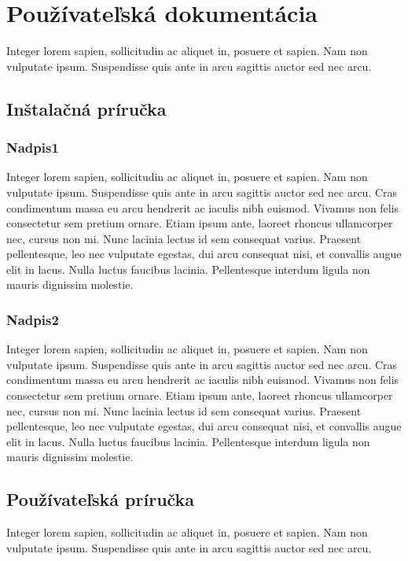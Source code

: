 \newpage
\section{Používateľská dokumentácia}
Integer lorem sapien, sollicitudin ac aliquet in, posuere et sapien. Nam non vulputate ipsum. Suspendisse quis ante in arcu sagittis auctor sed nec arcu.

\subsection{Inštalačná príručka}\label{install_guide}

\subsubsection{Nadpis1}
Integer lorem sapien, sollicitudin ac aliquet in, posuere et sapien. Nam non vulputate ipsum. Suspendisse quis ante in arcu sagittis auctor sed nec arcu. Cras condimentum massa eu arcu hendrerit ac iaculis nibh euismod. Vivamus non felis consectetur sem pretium ornare. Etiam ipsum ante, laoreet rhoncus ullamcorper nec, cursus non mi. Nunc lacinia lectus id sem consequat varius. Praesent pellentesque, leo nec vulputate egestas, dui arcu consequat nisi, et convallis augue elit in lacus. Nulla luctus faucibus lacinia. Pellentesque interdum ligula non mauris dignissim molestie.

\subsubsection{Nadpis2}
Integer lorem sapien, sollicitudin ac aliquet in, posuere et sapien. Nam non vulputate ipsum. Suspendisse quis ante in arcu sagittis auctor sed nec arcu. Cras condimentum massa eu arcu hendrerit ac iaculis nibh euismod. Vivamus non felis consectetur sem pretium ornare. Etiam ipsum ante, laoreet rhoncus ullamcorper nec, cursus non mi. Nunc lacinia lectus id sem consequat varius. Praesent pellentesque, leo nec vulputate egestas, dui arcu consequat nisi, et convallis augue elit in lacus. Nulla luctus faucibus lacinia. Pellentesque interdum ligula non mauris dignissim molestie.

\newpage
\subsection{Používateľská príručka}
Integer lorem sapien, sollicitudin ac aliquet in, posuere et sapien. Nam non vulputate ipsum. Suspendisse quis ante in arcu sagittis auctor sed nec arcu.

